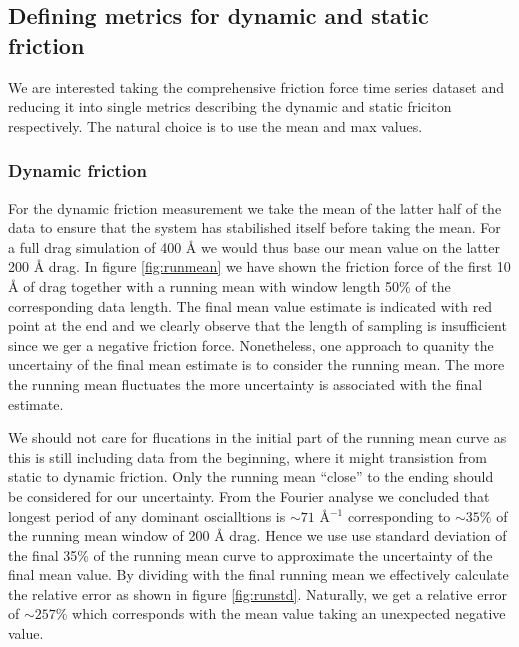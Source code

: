 \subsection{Defining metrics for dynamic and static friction}
We are interested taking the comprehensive friction force time series dataset
and reducing it into single metrics describing the dynamic and static friciton
respectively. The natural choice is to use the mean and max values. 

\subsubsection{Dynamic friction} 
For the dynamic friction measurement we take the mean of the latter half of the data to ensure that the system has
stabilished itself before taking the mean. For a full drag simulation of 400 Å
we would thus base our mean value on the latter 200 Å drag. In figure
\ref{fig:runmean} we have shown the friction force of the first 10 Å of drag
together with a running mean with window length 50\% of the corresponding data
length. The final mean value estimate is indicated with red point at the end and
we clearly observe that the length of sampling is insufficient since we ger a
negative friction force.  Nonetheless, one approach to quanity the uncertainy of
the final mean estimate is to consider the running mean. The more the running
mean fluctuates the more uncertainty is associated with the final estimate. 


We should not care for flucations in the initial part of the running mean curve
as this is still including data from the beginning, where it might transistion
from static to dynamic friction. Only the running mean ``close'' to the ending
should be considered for our uncertainty. From the Fourier analyse we concluded
that longest period of any dominant oscialltions is $\sim 71$ Å$^{-1}$
corresponding to $\sim 35 \%$ of the running mean window of 200 Å drag. Hence we use use standard deviation of the final 35\% of the running mean curve to approximate the uncertainty of the final mean value. By dividing with the final running mean we effectively calculate the relative error as shown in figure \ref{fig:runstd}. Naturally, we get a relative error of $\sim 257\%$ which corresponds with the mean value taking an unexpected negative value.


